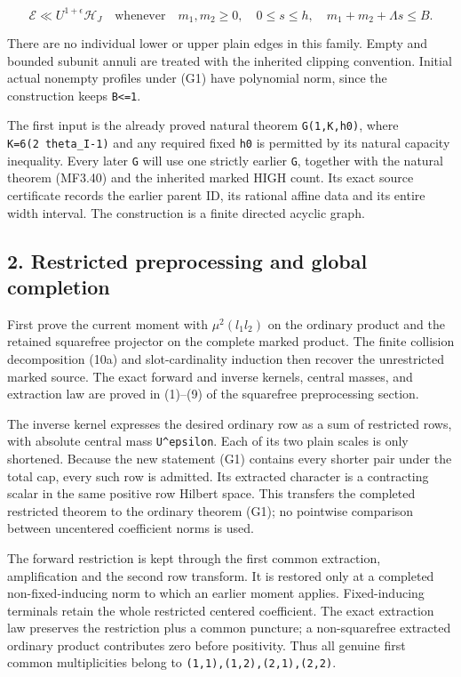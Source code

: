 \[
 \mathcal E\ll U^{1+\epsilon}\mathcal H_J
 \quad\text{whenever}\quad
 m_1,m_2\ge0,\quad 0\le s\le h,\quad
 m_1+m_2+\Lambda s\le B.
\tag{G1}
\]

There are no individual lower or upper plain edges in this family. Empty and bounded subunit annuli are treated with the inherited clipping convention. Initial actual nonempty profiles under (G1) have polynomial norm, since the construction keeps \texttt{B\textless{}=1}.

The first input is the already proved natural theorem \texttt{G(1,K,h0)}, where \texttt{K=6(2\ theta\_\allowbreak{}I-1)} and any required fixed \texttt{h0} is permitted by its natural capacity inequality. Every later \texttt{G} will use one strictly earlier \texttt{G}, together with the natural theorem (MF3.40) and the inherited marked HIGH count. Its exact source certificate records the earlier parent ID, its rational affine data and its entire width interval. The construction is a finite directed acyclic graph.

\hypertarget{sources:restricted-preprocessing-and-global-completion}{%
\subsection{2. Restricted preprocessing and global completion}\label{sources:restricted-preprocessing-and-global-completion}}

First prove the current moment with \(\mu^2(l_1l_2)\) on the ordinary product and the retained squarefree projector on the complete marked product. The finite collision decomposition (10a) and slot-cardinality induction then recover the unrestricted marked source. The exact forward and inverse kernels, central masses, and extraction law are proved in (1)--(9) of the squarefree preprocessing section.

The inverse kernel expresses the desired ordinary row as a sum of restricted rows, with absolute central mass \texttt{U\^{}epsilon}. Each of its two plain scales is only shortened. Because the new statement (G1) contains every shorter pair under the total cap, every such row is admitted. Its extracted character is a contracting scalar in the same positive row Hilbert space. This transfers the completed restricted theorem to the ordinary theorem (G1); no pointwise comparison between uncentered coefficient norms is used.

The forward restriction is kept through the first common extraction, amplification and the second row transform. It is restored only at a completed non-fixed-inducing norm to which an earlier moment applies. Fixed-inducing terminals retain the whole restricted centered coefficient. The exact extraction law preserves the restriction plus a common puncture; a non-squarefree extracted ordinary product contributes zero before positivity. Thus all genuine first common multiplicities belong to \texttt{(1,1),(1,2),(2,1),(2,2)}.

